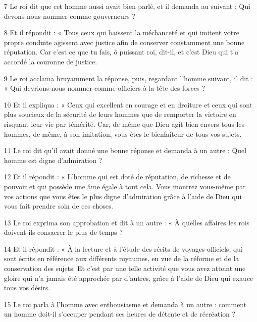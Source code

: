 \par 7 Le roi dit que cet homme aussi avait bien parlé, et il demanda au suivant : Qui devons-nous nommer comme gouverneurs ?

\par 8 Et il répondit : « Tous ceux qui haïssent la méchanceté et qui imitent votre propre conduite agissent avec justice afin de conserver constamment une bonne réputation. Car c'est ce que tu fais, ô puissant roi, dit-il, et c'est Dieu qui t'a accordé la couronne de justice.

\par 9 Le roi acclama bruyamment la réponse, puis, regardant l'homme suivant, il dit : « Qui devrions-nous nommer comme officiers à la tête des forces ?

\par 10 Et il expliqua : « Ceux qui excellent en courage et en droiture et ceux qui sont plus soucieux de la sécurité de leurs hommes que de remporter la victoire en risquant leur vie par témérité. Car, de même que Dieu agit bien envers tous les hommes, de même, à son imitation, vous êtes le bienfaiteur de tous vos sujets.

\par 11 Le roi dit qu'il avait donné une bonne réponse et demanda à un autre : Quel homme est digne d'admiration ?

\par 12 Et il répondit : « L'homme qui est doté de réputation, de richesse et de pouvoir et qui possède une âme égale à tout cela. Vous montrez vous-même par vos actions que vous êtes le plus digne d'admiration grâce à l'aide de Dieu qui vous fait prendre soin de ces choses.

\par 13 Le roi exprima son approbation et dit à un autre : « À quelles affaires les rois doivent-ils consacrer le plus de temps ?

\par 14 Et il répondit : « À la lecture et à l'étude des récits de voyages officiels, qui sont écrits en référence aux différents royaumes, en vue de la réforme et de la conservation des sujets. Et c'est par une telle activité que vous avez atteint une gloire qui n'a jamais été approchée par d'autres, grâce à l'aide de Dieu qui exauce tous vos désirs.

\par 15 Le roi parla à l'homme avec enthousiasme et demanda à un autre : comment un homme doit-il s'occuper pendant ses heures de détente et de récréation ?

